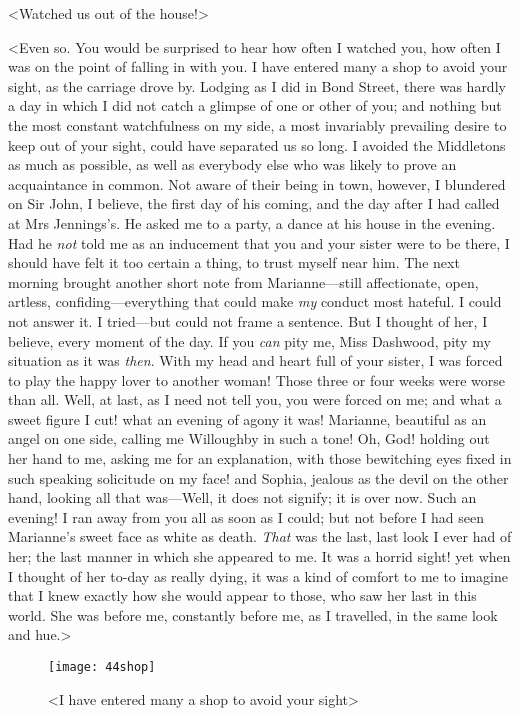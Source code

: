 <Watched us out of the house!>

<Even so. You would be surprised to hear how often I watched you, how often I was on the point of falling in with you. I have entered many a shop to avoid your sight, as the carriage drove by. Lodging as I did in Bond Street, there was hardly a day in which I did not catch a glimpse of one or other of you; and nothing but the most constant watchfulness on my side, a most invariably prevailing desire to keep out of your sight, could have separated us so long. I avoided the Middletons as much as possible, as well as everybody else who was likely to prove an acquaintance in common. Not aware of their being in town, however, I blundered on Sir John, I believe, the first day of his coming, and the day after I had called at Mrs Jennings's. He asked me to a party, a dance at his house in the evening. Had he \textit{not} told me as an inducement that you and your sister were to be there, I should have felt it too certain a thing, to trust myself near him. The next morning brought another short note from Marianne—still affectionate, open, artless, confiding—everything that could make \textit{my} conduct most hateful. I could not answer it. I tried—but could not frame a sentence. But I thought of her, I believe, every moment of the day. If you \textit{can} pity me, Miss Dashwood, pity my situation as it was \textit{then}. With my head and heart full of your sister, I was forced to play the happy lover to another woman! Those three or four weeks were worse than all. Well, at last, as I need not tell you, you were forced on me; and what a sweet figure I cut! what an evening of agony it was! Marianne, beautiful as an angel on one side, calling me Willoughby in such a tone! Oh, God! holding out her hand to me, asking me for an explanation, with those bewitching eyes fixed in such speaking solicitude on my face! and Sophia, jealous as the devil on the other hand, looking all that was—Well, it does not signify; it is over now. Such an evening! I ran away from you all as soon as I could; but not before I had seen Marianne's sweet face as white as death. \textit{That} was the last, last look I ever had of her; the last manner in which she appeared to me. It was a horrid sight! yet when I thought of her to-day as really dying, it was a kind of comfort to me to imagine that I knew exactly how she would appear to those, who saw her last in this world. She was before me, constantly before me, as I travelled, in the same look and hue.>

\begin{a4}
	\begin{figure}[tbph]
		\centering
		\texttt{[image: 44shop]}
		\caption{<I have entered many a shop to avoid your sight>}
	\end{figure}
\end{a4}

